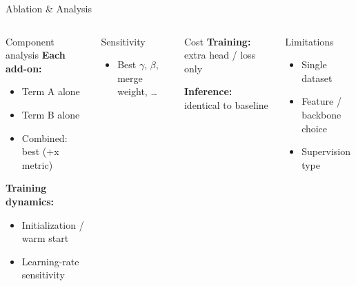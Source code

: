 \documentclass[9pt,aspectratio=169]{beamer}
\begin{document}
\begin{frame}{Ablation \& Analysis}
  \begin{columns}[T,onlytextwidth]
      \begin{block}{Component analysis}
        \textbf{Each add-on:}
        \begin{itemize}
          \item Term A alone
          \item Term B alone
          \item Combined: best (+x metric)
        \end{itemize}

        \textbf{Training dynamics:}
        \begin{itemize}
          \item Initialization / warm start
          \item Learning-rate sensitivity
        \end{itemize}
      \end{block}

      \begin{block}{Sensitivity}
        \begin{itemize}
          \item Best $\gamma$, $\beta$, merge weight, \ldots
        \end{itemize}
      \end{block}

      \begin{block}{Cost}
        \textbf{Training:} extra head / loss only

        \textbf{Inference:} identical to baseline
      \end{block}

      \vspace{0.5em}
      \begin{block}{Limitations}
        \begin{itemize}
          \item Single dataset
          \item Feature / backbone choice
          \item Supervision type
        \end{itemize}
      \end{block}
  \end{columns}
\end{frame}
\end{document}
